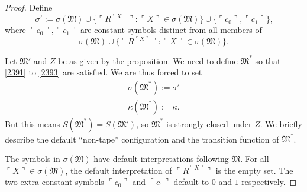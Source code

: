 \documentclass[12pt]{article}
\numberwithin{equation}{section}
\begin{document}
\begin{proof}
Define 
\begin{equation*}
    \sigma' := \sigma(\mathfrak{M}) \cup \{\ulcorner R^{\ulcorner X \urcorner} \urcorner : \ulcorner X \urcorner \in \sigma(\mathfrak{M})\} \cup \{\ulcorner c_0 \urcorner, \ulcorner c_1 \urcorner\} \text{,}
\end{equation*}
where $\ulcorner c_0 \urcorner, \ulcorner c_1 \urcorner$ are constant symbols distinct from all members of
\begin{equation*}
    \sigma(\mathfrak{M}) \cup \{\ulcorner R^{\ulcorner X \urcorner} \urcorner : \ulcorner X \urcorner \in \sigma(\mathfrak{M})\} \text{.}
\end{equation*}

Let $\mathfrak{M}'$ and $Z$ be as given by the proposition. We need to define $\mathfrak{M}^*$ so that \ref{2391} to \ref{2393} are satisfied. We are thus forced to set 
\begin{gather*}
    \sigma(\mathfrak{M}^*) := \sigma' \\
    \kappa(\mathfrak{M}^*) := \kappa \text{.}
\end{gather*}
But this means $S(\mathfrak{M}^*) = S(\mathfrak{M}')$, so $\mathfrak{M}^*$ is strongly closed under $Z$. We briefly describe the default ``non-tape'' configuration and the transition function of $\mathfrak{M}^*$. 

The symbols in $\sigma(\mathfrak{M})$ have default interpretations following $\mathfrak{M}$. For all $\ulcorner X \urcorner \in \sigma(\mathfrak{M})$, the default interpretation of $\ulcorner R^{\ulcorner X \urcorner} \urcorner$ is the empty set. The two extra constant symbols $\ulcorner c_0 \urcorner$ and $\ulcorner c_1 \urcorner$ default to $0$ and $1$ respectively. 


\end{proof}
\end{document}
